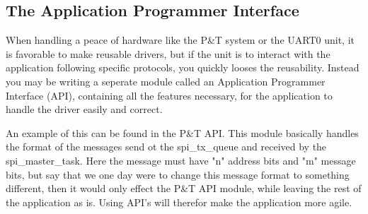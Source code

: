\subsection{The Application Programmer Interface}
\label{sec:TheApplicationProgrammerInterface}

When handling a peace of hardware like the P\&T system or the UART0 unit, it is favorable to make reusable drivers, but if the unit is to interact with the application following specific protocols, you quickly looses the reusability. 
Instead you may be writing a seperate module called an Application Programmer Interface (API), containing all the features necessary, for the application to handle the driver easily and correct.

An example of this can be found in the P\&T API. This module basically handles the format of the messages send ot the spi\_tx\_queue and received by the spi\_master\_task. Here the message must have "n" address bits and "m" message bits, but say that we one day were to change this message format to something different, then it would only effect the P\&T API module, while leaving the rest of the application as is. Using API's will therefor make the application more agile. 

